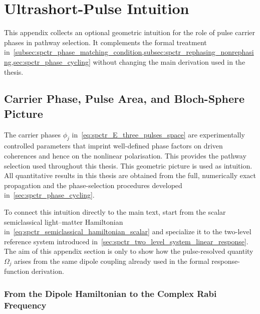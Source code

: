 \chapter{Ultrashort-Pulse Intuition}
\label{app:phase_kick_intuition}

This appendix collects an optional geometric intuition for the role of pulse carrier phases in pathway selection. It complements the formal treatment in~\autoref{subsec:spctr_phase_matching_condition,subsec:spctr_rephasing_nonrephasing,sec:spctr_phase_cycling} without changing the main derivation used in the thesis.

\section{Carrier Phase, Pulse Area, and Bloch-Sphere Picture}
\label{app:sec:phase_kick_pulse_area_intuition}

The carrier phases $\phi_j$ in~\autoref{eq:spctr_E_three_pulses_space} are experimentally controlled parameters that imprint well-defined phase factors on driven coherences and hence on the nonlinear polarisation. This provides the pathway selection used throughout this thesis.
This geometric picture is used as intuition. All quantitative results in this thesis are obtained from the full, numerically exact propagation and the phase-selection procedures developed in~\autoref{sec:spctr_phase_cycling}.

To connect this intuition directly to the main text, start from the scalar semiclassical light--matter Hamiltonian in~\autoref{eq:spctr_semiclassical_hamiltonian_scalar} and specialize it to the two-level reference system introduced in~\autoref{sec:spctr_two_level_system_linear_response}. The aim of this appendix section is only to show how the pulse-resolved quantity $\Omega_j$ arises from the same dipole coupling already used in the formal response-function derivation.

\subsection{From the Dipole Hamiltonian to the Complex Rabi Frequency}

